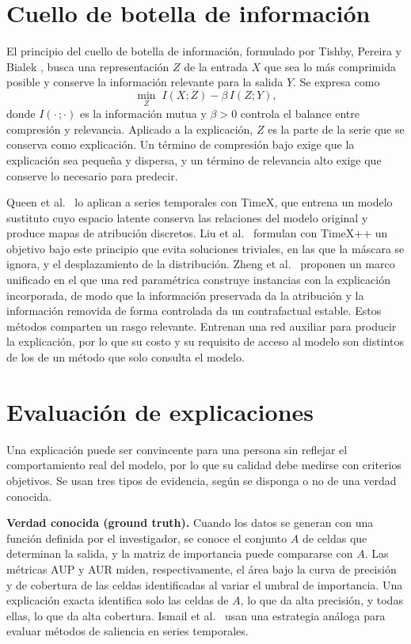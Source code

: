 \section{Cuello de botella de información}
\label{sec:mt_ib}

El principio del cuello de botella de información, formulado por Tishby, Pereira y Bialek \cite{tishby2000}, busca una representación $Z$ de la entrada $X$ que sea lo más comprimida posible y conserve la información relevante para la salida $Y$. Se expresa como
\begin{equation}
    \min_{Z} \; I(X;Z) - \beta \, I(Z;Y),
\end{equation}
donde $I(\cdot\,;\cdot)$ es la información mutua y $\beta > 0$ controla el balance entre compresión y relevancia. Aplicado a la explicación, $Z$ es la parte de la serie que se conserva como explicación. Un término de compresión bajo exige que la explicación sea pequeña y dispersa, y un término de relevancia alto exige que conserve lo necesario para predecir.

Queen et al.\ \cite{queen2023timex} lo aplican a series temporales con TimeX, que entrena un modelo sustituto cuyo espacio latente conserva las relaciones del modelo original y produce mapas de atribución discretos. Liu et al.\ \cite{liu2024timexpp} formulan con TimeX++ un objetivo bajo este principio que evita soluciones triviales, en las que la máscara se ignora, y el desplazamiento de la distribución. Zheng et al.\ \cite{zheng2026unifiedib} proponen un marco unificado en el que una red paramétrica construye instancias con la explicación incorporada, de modo que la información preservada da la atribución y la información removida de forma controlada da un contrafactual estable. Estos métodos comparten un rasgo relevante. Entrenan una red auxiliar para producir la explicación, por lo que su costo y su requisito de acceso al modelo son distintos de los de un método que solo consulta el modelo.

\section{Evaluación de explicaciones}
\label{sec:mt_evaluacion}

Una explicación puede ser convincente para una persona sin reflejar el comportamiento real del modelo, por lo que su calidad debe medirse con criterios objetivos. Se usan tres tipos de evidencia, según se disponga o no de una verdad conocida.

\textbf{Verdad conocida (ground truth).} Cuando los datos se generan con una función definida por el investigador, se conoce el conjunto $A$ de celdas que determinan la salida, y la matriz de importancia puede compararse con $A$. Las métricas AUP y AUR \cite{crabbe2021} miden, respectivamente, el área bajo la curva de precisión y de cobertura de las celdas identificadas al variar el umbral de importancia. Una explicación exacta identifica solo las celdas de $A$, lo que da alta precisión, y todas ellas, lo que da alta cobertura. Ismail et al.\ \cite{ismail2020} usan una estrategia análoga para evaluar métodos de saliencia en series temporales.


